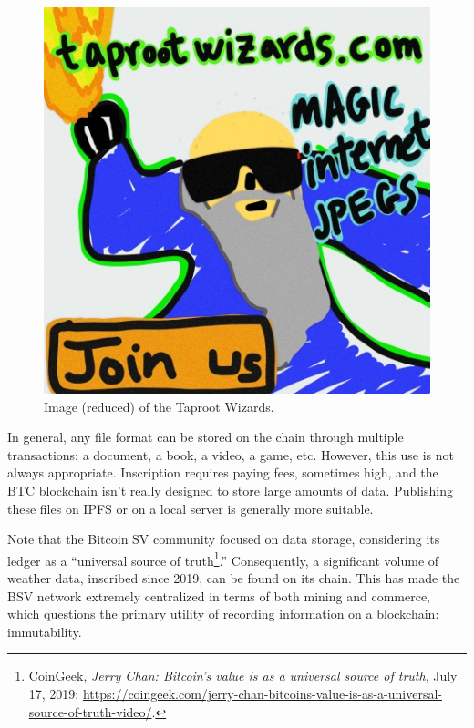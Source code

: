 \documentclass[
  a5paper,
  smalldemyvopaper,10pt,twoside,onecolumn,openright,extrafontsizes,hidelinks]{memoir}
\begin{document}
\begin{figure}

{\centering \includegraphics{chapters/img/taproot-wizards-small-0301e0480b374b32851a9462db29dc19fe830a7f7d7a88b81612b9d42099c0aei0.jpg}

}

\caption{Image (reduced) of the Taproot Wizards.}

\end{figure}%

In general, any file format can be stored on the chain through multiple
transactions: a document, a book, a video, a game, etc. However, this
use is not always appropriate. Inscription requires paying fees,
sometimes high, and the BTC blockchain isn't really designed to store
large amounts of data. Publishing these files on IPFS or on a local
server is generally more suitable.

Note that the Bitcoin SV community focused on data storage, considering
its ledger as a ``universal source of truth\footnote{CoinGeek,
  \emph{Jerry Chan: Bitcoin's value is as a universal source of truth},
  July 17, 2019:
  \url{https://coingeek.com/jerry-chan-bitcoins-value-is-as-a-universal-source-of-truth-video/}.}.''
Consequently, a significant volume of weather data, inscribed since
2019, can be found on its chain. This has made the BSV network extremely
centralized in terms of both mining and commerce, which questions the
primary utility of recording information on a blockchain: immutability.
\end{document}
